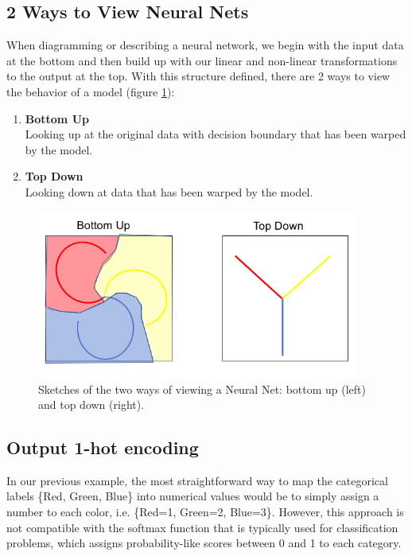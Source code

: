 \subsection{2 Ways to View Neural Nets}
When diagramming or describing a neural network, we begin with the input data at the bottom and then build up with our linear and non-linear transformations to the output at the top. With this structure defined, there are 2 ways to view the behavior of a model (figure \ref{fig:views}):\\

\begin{enumerate}
    \item \textbf{Bottom Up}\\
    Looking up at the original data with decision boundary that has been warped by the model.
    \item \textbf{Top Down}\\
    Looking down at data that has been warped by the model.
\end{enumerate}

\begin{figure}[ht]
    \centering
    \includegraphics[width=300pt]{labs/02/images/views.png}
    \caption{Sketches of the two ways of viewing a Neural Net: bottom up (left) and top down (right).}
    \label{fig:views}
\end{figure}

\subsection{Output 1-hot encoding} \label{ssc:1hot}
In our previous example, the most straightforward way to map the categorical labels \{Red, Green, Blue\} into numerical values would be to simply assign a number to each color, i.e. \{Red=1, Green=2, Blue=3\}. However, this approach is not compatible with the softmax function that is typically used for classification problems, which assigns probability-like scores between 0 and 1 to each category. 

